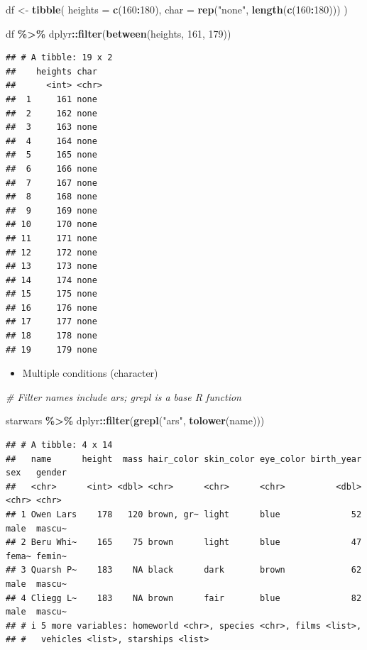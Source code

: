 \documentclass[
]{book}
\newenvironment{Shaded}{\begin{snugshade}}{\end{snugshade}}
\newcommand{\AttributeTok}[1]{\textcolor[rgb]{0.13,0.29,0.53}{#1}}
\newcommand{\CommentTok}[1]{\textcolor[rgb]{0.56,0.35,0.01}{\textit{#1}}}
\newcommand{\DecValTok}[1]{\textcolor[rgb]{0.00,0.00,0.81}{#1}}
\newcommand{\FunctionTok}[1]{\textcolor[rgb]{0.13,0.29,0.53}{\textbf{#1}}}
\newcommand{\NormalTok}[1]{#1}
\newcommand{\OtherTok}[1]{\textcolor[rgb]{0.56,0.35,0.01}{#1}}
\newcommand{\SpecialCharTok}[1]{\textcolor[rgb]{0.81,0.36,0.00}{\textbf{#1}}}
\newcommand{\StringTok}[1]{\textcolor[rgb]{0.31,0.60,0.02}{#1}}
\providecommand{\tightlist}{%
  \setlength{\itemsep}{0pt}\setlength{\parskip}{0pt}}
\begin{document}
\begin{Shaded}
\begin{Highlighting}[]
\NormalTok{df }\OtherTok{\textless{}{-}} \FunctionTok{tibble}\NormalTok{(}
  \AttributeTok{heights =} \FunctionTok{c}\NormalTok{(}\DecValTok{160}\SpecialCharTok{:}\DecValTok{180}\NormalTok{),}
  \AttributeTok{char =} \FunctionTok{rep}\NormalTok{(}\StringTok{"none"}\NormalTok{, }\FunctionTok{length}\NormalTok{(}\FunctionTok{c}\NormalTok{(}\DecValTok{160}\SpecialCharTok{:}\DecValTok{180}\NormalTok{)))}
\NormalTok{)}

\NormalTok{df }\SpecialCharTok{\%\textgreater{}\%}
\NormalTok{  dplyr}\SpecialCharTok{::}\FunctionTok{filter}\NormalTok{(}\FunctionTok{between}\NormalTok{(heights, }\DecValTok{161}\NormalTok{, }\DecValTok{179}\NormalTok{))}
\end{Highlighting}
\end{Shaded}

\begin{verbatim}
## # A tibble: 19 x 2
##    heights char 
##      <int> <chr>
##  1     161 none 
##  2     162 none 
##  3     163 none 
##  4     164 none 
##  5     165 none 
##  6     166 none 
##  7     167 none 
##  8     168 none 
##  9     169 none 
## 10     170 none 
## 11     171 none 
## 12     172 none 
## 13     173 none 
## 14     174 none 
## 15     175 none 
## 16     176 none 
## 17     177 none 
## 18     178 none 
## 19     179 none
\end{verbatim}

\begin{itemize}
\tightlist
\item
  Multiple conditions (character)
\end{itemize}

\begin{Shaded}
\begin{Highlighting}[]
\CommentTok{\# Filter names include ars; \textasciigrave{}grepl\textasciigrave{} is a base R function}

\NormalTok{starwars }\SpecialCharTok{\%\textgreater{}\%}
\NormalTok{  dplyr}\SpecialCharTok{::}\FunctionTok{filter}\NormalTok{(}\FunctionTok{grepl}\NormalTok{(}\StringTok{"ars"}\NormalTok{, }\FunctionTok{tolower}\NormalTok{(name)))}
\end{Highlighting}
\end{Shaded}

\begin{verbatim}
## # A tibble: 4 x 14
##   name      height  mass hair_color skin_color eye_color birth_year sex   gender
##   <chr>      <int> <dbl> <chr>      <chr>      <chr>          <dbl> <chr> <chr> 
## 1 Owen Lars    178   120 brown, gr~ light      blue              52 male  mascu~
## 2 Beru Whi~    165    75 brown      light      blue              47 fema~ femin~
## 3 Quarsh P~    183    NA black      dark       brown             62 male  mascu~
## 4 Cliegg L~    183    NA brown      fair       blue              82 male  mascu~
## # i 5 more variables: homeworld <chr>, species <chr>, films <list>,
## #   vehicles <list>, starships <list>
\end{verbatim}
\end{document}
